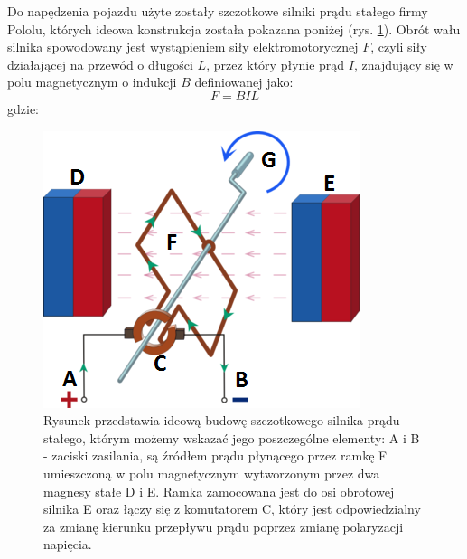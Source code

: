 Do napędzenia pojazdu użyte zostały szczotkowe silniki prądu stałego firmy Pololu, których ideowa konstrukcja została pokazana poniżej (rys. \ref{silnik_p}). Obrót wału silnika spowodowany jest wystąpieniem siły elektromotorycznej $F$, czyli siły działającej na przewód o długości $L$, przez który płynie prąd $I$, znajdujący się w polu magnetycznym o indukcji $B$ definiowanej jako:
\begin{equation}
	F =  BIL
   \label{eq:sila_elektromotoryczna}
 \end{equation}
 gdzie:  
 \begin{equationDescriptor}
 \end{equationDescriptor}
 \newpage
  \begin{figure}[H]
    \begin{center}
      \includegraphics[scale=0.7]{imgs/silnik_p_stalego.png}
 	\caption[Schemat ideowy silnika prądu stałego.]{\small{Rysunek przedstawia ideową budowę szczotkowego silnika prądu stałego, którym możemy wskazać jego poszczególne elementy: A i B - zaciski zasilania, są źródłem prądu płynącego przez ramkę F umieszczoną w polu magnetycznym wytworzonym przez dwa magnesy stałe D i E. Ramka zamocowana jest do osi obrotowej silnika E oraz łączy się z komutatorem C, który jest odpowiedzialny za zmianę kierunku przepływu prądu poprzez zmianę polaryzacji napięcia.}\footnotemark}
	\label{silnik_p}
    \end{center}
  \end{figure}  
\noindent
